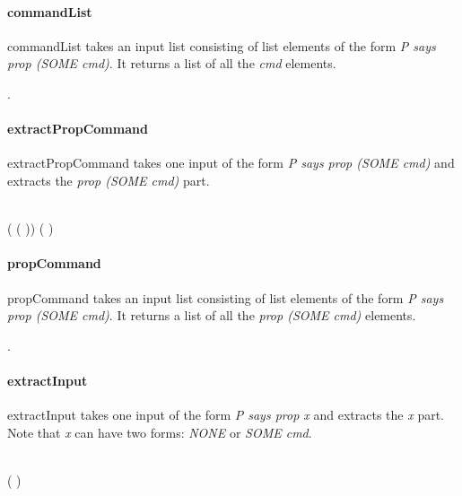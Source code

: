 \documentclass[../../main/main.tex]{subfiles}
\begin{document}
\paragraph*{commandList}
commandList takes an input list consisting of list elements of the form \textit{P says prop (SOME cmd)}.  It returns a list of all the \textit{cmd} elements.
\begin{tabbing}
\parskip=8pt
\HOLTokenTurnstile{} \HOLSymConst{\HOLTokenForall{}}. \\
\hspace{0.3cm}   \HOLSymConst{=}   
\parskip=18pt
\end{tabbing}

\paragraph*{extractPropCommand}
extractPropCommand takes one input of the form \textit{P says prop (SOME cmd)} and extracts the \textit{prop (SOME cmd)} part.
\begin{tabbing}
\parskip=8pt
\HOLTokenTurnstile{}\\
\hspace{0.3cm}  (   ( )) \HOLSymConst{=}  ( )
\parskip=18pt
\end{tabbing}

\paragraph*{propCommand}
propCommand takes an input list consisting of list elements of the form \textit{P says prop (SOME cmd)}.  It returns a list of all the \textit{prop (SOME cmd)} elements.
\begin{tabbing}
\parskip=8pt
\HOLTokenTurnstile{} \HOLSymConst{\HOLTokenForall{}}. \\
\hspace{0.3cm}   \HOLSymConst{=}   
\parskip=18pt
\end{tabbing}


\paragraph*{extractInput}
extractInput takes one input of the form \textit{P says prop x} and extracts the \textit{x} part. Note that \textit{x} can have two forms: \textit{NONE} or \textit{SOME cmd}.
\begin{tabbing}
\parskip=8pt
\HOLTokenTurnstile{}\\
\hspace{0.3cm}  (   ) \HOLSymConst{=} 
\parskip=18pt
\end{tabbing}
\end{document}
